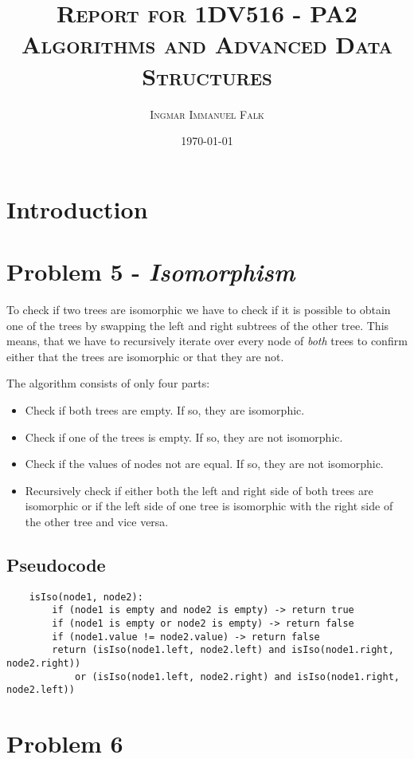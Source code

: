 \documentclass{article}
\title{\textsc{Report for 1DV516 - PA2\\\large{Algorithms and Advanced Data Structures}}}
\author{\textsc{Ingmar Immanuel Falk}}
\date{\textsc{\today}}
\begin{document}
\maketitle
\pagebreak
\tableofcontents
\pagebreak

\section{Introduction}



\section{Problem 5 - \textit{Isomorphism}}

To check if two trees are isomorphic we have to check if it is possible to obtain
one of the trees by swapping the left and right subtrees of the other tree. This means,
that we have to recursively iterate over every node of \emph{both} trees to confirm
either that the trees are isomorphic or that they are not.

The algorithm consists of only four parts:
\begin{itemize}
    \item Check if both trees are empty. If so, they are isomorphic.
    \item Check if one of the trees is empty. If so, they are not isomorphic.
    \item Check if the values of nodes not are equal. If so, they are not isomorphic.
    \item Recursively check if either both the left and right side of both trees are 
    isomorphic or if the left side of one tree is isomorphic with the right side of the other tree and vice versa.
\end{itemize}

\subsection{Pseudocode}

\begin{verbatim}
    isIso(node1, node2):
        if (node1 is empty and node2 is empty) -> return true
        if (node1 is empty or node2 is empty) -> return false
        if (node1.value != node2.value) -> return false
        return (isIso(node1.left, node2.left) and isIso(node1.right, node2.right)) 
            or (isIso(node1.left, node2.right) and isIso(node1.right, node2.left))
\end{verbatim}

\section{Problem 6}
\end{document}
